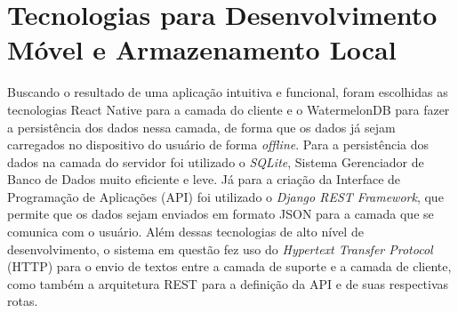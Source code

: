 \section{Tecnologias para Desenvolvimento Móvel e Armazenamento Local}
\label{sec:roadvet-tecnologias}
Buscando o resultado de uma aplicação intuitiva e funcional, foram escolhidas as tecnologias React Native para a camada do cliente e o WatermelonDB para fazer a persistência dos dados nessa camada, de forma que os dados já sejam carregados no dispositivo do usuário de forma \textit{offline}. Para a persistência dos dados na camada do servidor foi utilizado o \textit{SQLite}, Sistema Gerenciador de Banco de Dados muito eficiente e leve. Já para a criação da Interface de Programação de Aplicações (API) foi utilizado o \textit{Django REST Framework}, que permite que os dados sejam enviados em formato JSON para a camada que se comunica com o usuário. Além dessas tecnologias de alto nível de desenvolvimento, o sistema em questão fez uso do \textit{Hypertext Transfer Protocol} (HTTP) para o envio de textos entre a camada de suporte e a camada de cliente, como também a arquitetura REST \cite{fielding2000} para a definição da API e de suas respectivas rotas.

